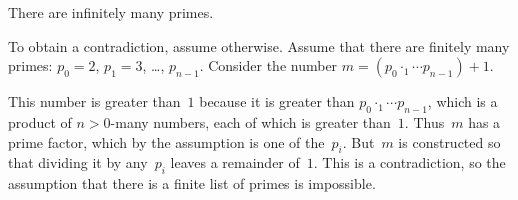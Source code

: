 \documentclass{test}  %
\begin{document}
\begin{problem}
\end{problem}                   

\begin{problem} 
There are infinitely many primes.  
\begin{answer}
To obtain a contradiction, assume otherwise.
Assume that there are finitely many primes: 
$p_0=2$, $p_1=3$, \ldots, $p_{n-1}$.
Consider the number $m=(p_0\cdotp_1\cdots p_{n-1})+1$.

This number is greater than~$1$ because it is greater than 
$p_0\cdotp_1\cdots p_{n-1}$, 
which is a product of $n>0$-many numbers, each of which is greater than~$1$.
Thus~$m$ has a prime factor, which by the assumption is one of the~$p_i$.
But~$m$ is constructed so that dividing it by any~$p_i$ 
leaves a remainder of~$1$.
This is a contradiction, so the assumption that there is a finite
list of primes is impossible.
\end{answer}
\end{problem}
\end{document}
